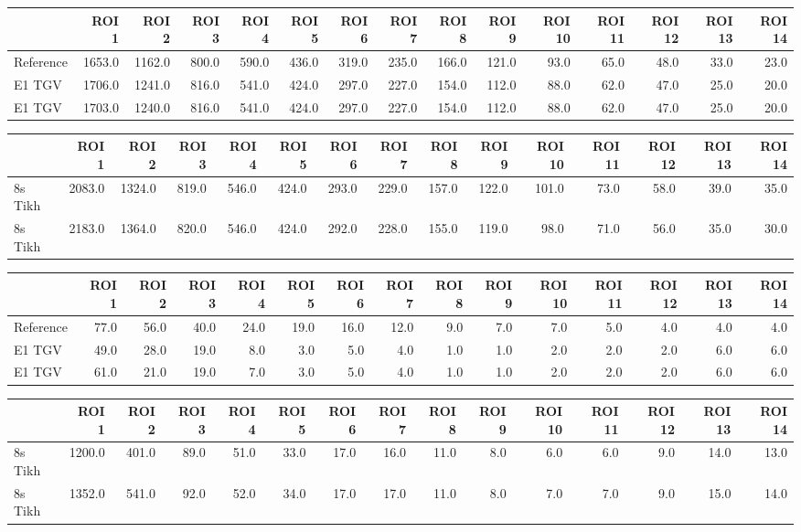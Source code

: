 \begin{tabular}{lrrrrrrrrrrrrrr}
\toprule
{} &   ROI 1 &   ROI 2 &  ROI 3 &  ROI 4 &  ROI 5 &  ROI 6 &  ROI 7 &  ROI 8 &  ROI 9 &  ROI 10 &  ROI 11 &  ROI 12 &  ROI 13 &  ROI 14 \\
\midrule
Reference &  1653.0 &  1162.0 &  800.0 &  590.0 &  436.0 &  319.0 &  235.0 &  166.0 &  121.0 &    93.0 &    65.0 &    48.0 &    33.0 &    23.0 \\
E1 TGV    &  1706.0 &  1241.0 &  816.0 &  541.0 &  424.0 &  297.0 &  227.0 &  154.0 &  112.0 &    88.0 &    62.0 &    47.0 &    25.0 &    20.0 \\
E1 TGV    &  1703.0 &  1240.0 &  816.0 &  541.0 &  424.0 &  297.0 &  227.0 &  154.0 &  112.0 &    88.0 &    62.0 &    47.0 &    25.0 &    20.0 \\
\bottomrule
\end{tabular}
\begin{tabular}{lrrrrrrrrrrrrrr}
\toprule
{} &   ROI 1 &   ROI 2 &  ROI 3 &  ROI 4 &  ROI 5 &  ROI 6 &  ROI 7 &  ROI 8 &  ROI 9 &  ROI 10 &  ROI 11 &  ROI 12 &  ROI 13 &  ROI 14 \\
\midrule
8s Tikh &  2083.0 &  1324.0 &  819.0 &  546.0 &  424.0 &  293.0 &  229.0 &  157.0 &  122.0 &   101.0 &    73.0 &    58.0 &    39.0 &    35.0 \\
8s Tikh &  2183.0 &  1364.0 &  820.0 &  546.0 &  424.0 &  292.0 &  228.0 &  155.0 &  119.0 &    98.0 &    71.0 &    56.0 &    35.0 &    30.0 \\
\bottomrule
\end{tabular}
\begin{tabular}{lrrrrrrrrrrrrrr}
\toprule
{} &  ROI 1 &  ROI 2 &  ROI 3 &  ROI 4 &  ROI 5 &  ROI 6 &  ROI 7 &  ROI 8 &  ROI 9 &  ROI 10 &  ROI 11 &  ROI 12 &  ROI 13 &  ROI 14 \\
\midrule
Reference &   77.0 &   56.0 &   40.0 &   24.0 &   19.0 &   16.0 &   12.0 &    9.0 &    7.0 &     7.0 &     5.0 &     4.0 &     4.0 &     4.0 \\
E1 TGV    &   49.0 &   28.0 &   19.0 &    8.0 &    3.0 &    5.0 &    4.0 &    1.0 &    1.0 &     2.0 &     2.0 &     2.0 &     6.0 &     6.0 \\
E1 TGV    &   61.0 &   21.0 &   19.0 &    7.0 &    3.0 &    5.0 &    4.0 &    1.0 &    1.0 &     2.0 &     2.0 &     2.0 &     6.0 &     6.0 \\
\bottomrule
\end{tabular}
\begin{tabular}{lrrrrrrrrrrrrrr}
\toprule
{} &   ROI 1 &  ROI 2 &  ROI 3 &  ROI 4 &  ROI 5 &  ROI 6 &  ROI 7 &  ROI 8 &  ROI 9 &  ROI 10 &  ROI 11 &  ROI 12 &  ROI 13 &  ROI 14 \\
\midrule
8s Tikh &  1200.0 &  401.0 &   89.0 &   51.0 &   33.0 &   17.0 &   16.0 &   11.0 &    8.0 &     6.0 &     6.0 &     9.0 &    14.0 &    13.0 \\
8s Tikh &  1352.0 &  541.0 &   92.0 &   52.0 &   34.0 &   17.0 &   17.0 &   11.0 &    8.0 &     7.0 &     7.0 &     9.0 &    15.0 &    14.0 \\
\bottomrule
\end{tabular}
